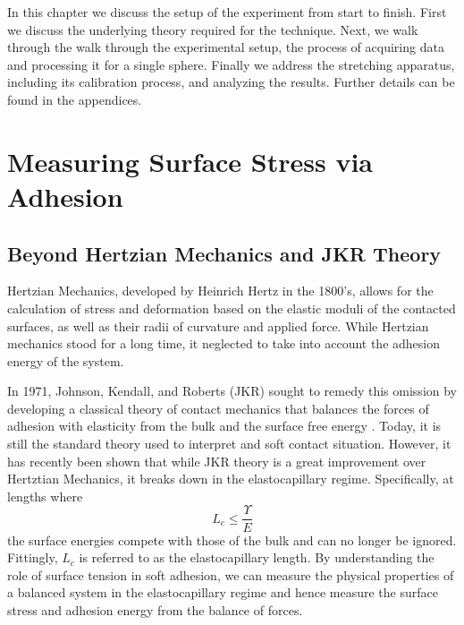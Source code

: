 In this chapter we discuss the setup of the experiment from start to finish. First we discuss the underlying theory required for the technique. Next, we walk through the walk through the experimental setup, the process of acquiring data and processing it for a single sphere. Finally we address the stretching apparatus, including its calibration process, and analyzing the results. Further details can be found in the appendices.

\section{Measuring Surface Stress via Adhesion}
\subsection{Beyond Hertzian Mechanics and JKR Theory}

Hertzian Mechanics, developed by Heinrich Hertz in the 1800's, allows for the calculation of stress and deformation based on the elastic moduli of the contacted surfaces, as well as their radii of curvature and applied force. While Hertzian mechanics stood for a long time, it neglected to take into account the adhesion energy of the system.  

In 1971, Johnson, Kendall, and Roberts (JKR) sought to remedy this omission by developing a classical theory of contact mechanics that balances the forces of adhesion with elasticity from the bulk and the surface free energy {\cite{johnson1971surface}}. Today, it is still the standard theory used to interpret and soft contact situation. However, it has recently been shown that while JKR theory is a great improvement over Hertztian Mechanics, it breaks down in the elastocapillary regime.  Specifically, at lengths where 
\begin{equation}
\label{EC_regime}
L_{c} \leq \frac{\Upsilon}{E}
\end{equation}
the surface energies compete with those of the bulk and can no longer be ignored. Fittingly, $L_c$ is referred to as the elastocapillary length. By understanding the role of surface tension in soft adhesion, we can measure the physical properties of a balanced system in the elastocapillary regime and hence measure the surface stress and adhesion energy from the balance of forces.



